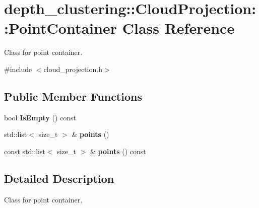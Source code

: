 \hypertarget{classdepth__clustering_1_1CloudProjection_1_1PointContainer}{\section{depth\-\_\-clustering\-:\-:Cloud\-Projection\-:\-:Point\-Container Class Reference}
\label{classdepth__clustering_1_1CloudProjection_1_1PointContainer}
}


Class for point container.  




{\ttfamily \#include $<$cloud\-\_\-projection.\-h$>$}

\subsection*{Public Member Functions}
\begin{DoxyCompactItemize}
\item 
\hypertarget{classdepth__clustering_1_1CloudProjection_1_1PointContainer_a04c9da3197caf249336116e564130b73}{bool {\bfseries Is\-Empty} () const }\label{classdepth__clustering_1_1CloudProjection_1_1PointContainer_a04c9da3197caf249336116e564130b73}

\item 
\hypertarget{classdepth__clustering_1_1CloudProjection_1_1PointContainer_a181d55691ad407d84c9dadbdbb4d3553}{std\-::list$<$ size\-\_\-t $>$ \& {\bfseries points} ()}\label{classdepth__clustering_1_1CloudProjection_1_1PointContainer_a181d55691ad407d84c9dadbdbb4d3553}

\item 
\hypertarget{classdepth__clustering_1_1CloudProjection_1_1PointContainer_ad09826ecee72534edf9599360418995b}{const std\-::list$<$ size\-\_\-t $>$ \& {\bfseries points} () const }\label{classdepth__clustering_1_1CloudProjection_1_1PointContainer_ad09826ecee72534edf9599360418995b}

\end{DoxyCompactItemize}


\subsection{Detailed Description}
Class for point container. 

